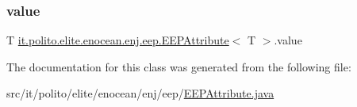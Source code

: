 \hypertarget{classit_1_1polito_1_1elite_1_1enocean_1_1enj_1_1eep_1_1_e_e_p_attribute_af4d7e34642004bb6ccfae51e925c983d}{}\label{classit_1_1polito_1_1elite_1_1enocean_1_1enj_1_1eep_1_1_e_e_p_attribute_af4d7e34642004bb6ccfae51e925c983d} 
\subsubsection{\texorpdfstring{value}{value}}
{\footnotesize\ttfamily T \hyperlink{classit_1_1polito_1_1elite_1_1enocean_1_1enj_1_1eep_1_1_e_e_p_attribute}{it.\+polito.\+elite.\+enocean.\+enj.\+eep.\+E\+E\+P\+Attribute}$<$ T $>$.value\hspace{0.3cm}{\ttfamily [protected]}}



The documentation for this class was generated from the following file\+:\begin{DoxyCompactItemize}
\item 
src/it/polito/elite/enocean/enj/eep/\hyperlink{_e_e_p_attribute_8java}{E\+E\+P\+Attribute.\+java}\end{DoxyCompactItemize}
